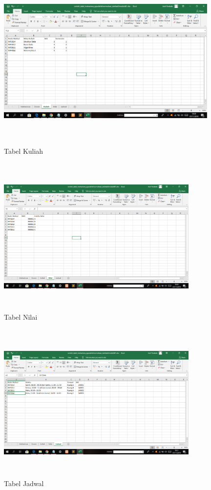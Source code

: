 \begin{enumerate}
\begin{figure}[!htbp]
\centering
\includegraphics[width=11cm,height=9cm]{figures/3tabel_kuliah.png}
\caption{Tabel Kuliah}
\label{penanda}
\end{figure}
    
\begin{figure}[!htbp]
\centering
\includegraphics[width=10cm,height=8cm]{figures/4tabel_nilai.png}
\caption{Tabel Nilai}
\label{penanda}
\end{figure}

\begin{figure}[!htbp]
\centering
\includegraphics[width=10cm,height=8cm]{figures/5tabel_jadwal.png}
\caption{Tabel Jadwal}
\label{penanda}
\end{figure}


\end{enumerate}
